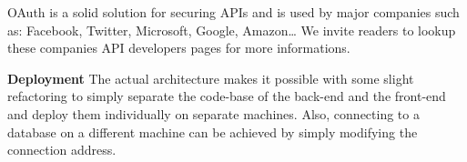 OAuth is a solid solution for securing APIs and is used by major companies such as:
Facebook, Twitter, Microsoft, Google, Amazon\ldots
We invite readers to lookup these companies API developers pages for more
informations.

\textbf{Deployment}\newline
The actual architecture makes it possible with some slight refactoring to simply separate
the code-base of the back-end and the front-end and deploy them individually on separate machines.
Also, connecting to a database on a different machine can be achieved by simply
modifying the connection address.